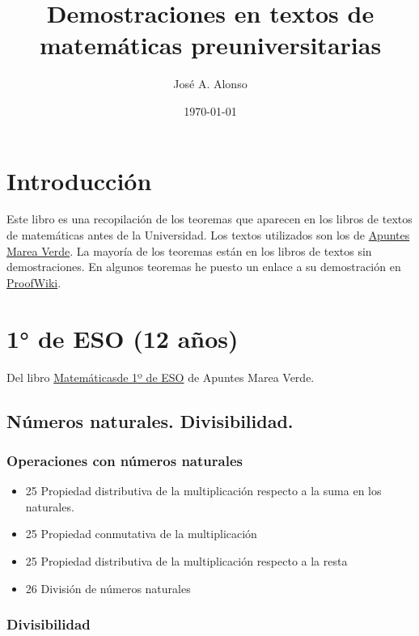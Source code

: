 \documentclass[a4paper,12pt,twoside]{book}
\author{José A. Alonso}
\date{\today}
\title{Demostraciones en textos de matemáticas preuniversitarias}
\theoremstyle{teorema}
\theoremstyle{remark}
\begin{document}
\maketitle
\tableofcontents

\chapter*{Introducción}

Este libro es una recopilación de los teoremas que aparecen en los
libros de textos de matemáticas antes de la Universidad. Los textos
utilizados son los de \href{http://www.apuntesmareaverde.org.es/}{Apuntes Marea Verde}. La mayoría de los teoremas
están en los libros de textos sin demostraciones. En algunos teoremas he
puesto un enlace a su demostración en \href{https://proofwiki.org}{ProofWiki}.

\chapter{1° de ESO (12 años)}
\label{sec:orgbde372e}

Del libro \href{http://www.apuntesmareaverde.org.es/grupos/mat/LOMLOE/1ESO/1ESO.pdf}{Matemáticasde 1º de ESO} de Apuntes Marea Verde.

\section{Números naturales. Divisibilidad.}
\label{sec:orgb62546c}

\subsection{Operaciones con números naturales}
\label{sec:org42b49b0}

\begin{itemize}
\item 25 Propiedad distributiva de la multiplicación respecto a la suma en los naturales.

\item 25 Propiedad conmutativa de la multiplicación

\item 25 Propiedad distributiva de la multiplicación respecto a la resta

\item 26 División de números naturales
\end{itemize}

\subsection{Divisibilidad}
\label{sec:orgfecbced}
\end{document}
